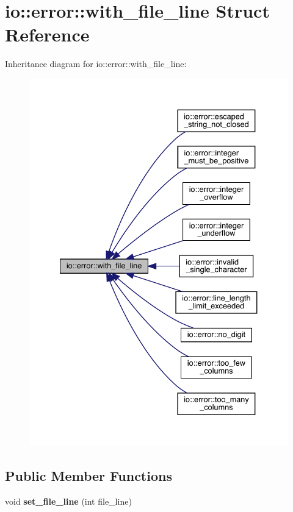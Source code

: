 \hypertarget{structio_1_1error_1_1with__file__line}{}\section{io\+:\+:error\+:\+:with\+\_\+file\+\_\+line Struct Reference}
\label{structio_1_1error_1_1with__file__line}


Inheritance diagram for io\+:\+:error\+:\+:with\+\_\+file\+\_\+line\+:
\nopagebreak
\begin{figure}[H]
\begin{center}
\leavevmode
\includegraphics[width=334pt]{structio_1_1error_1_1with__file__line__inherit__graph}
\end{center}
\end{figure}
\subsection*{Public Member Functions}
\begin{DoxyCompactItemize}
\item 
void {\bfseries set\+\_\+file\+\_\+line} (int file\+\_\+line)\hypertarget{structio_1_1error_1_1with__file__line_aa92778a81778abc676ec6ee9952bba8c}{}\label{structio_1_1error_1_1with__file__line_aa92778a81778abc676ec6ee9952bba8c}

\end{DoxyCompactItemize}
